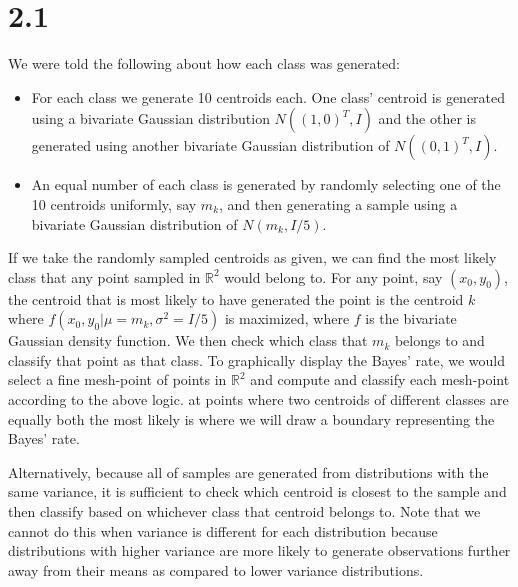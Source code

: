 \section*{2.1}

\noindent
We were told the following about how each class was generated:

\begin{itemize}
\item For each class we generate 10 centroids each. One class' centroid is 
generated using a bivariate Gaussian distribution $N((1, 0)^{T}, I)$ and the 
other is generated using another bivariate Gaussian distribution of 
$N((0, 1)^{T}, I)$.
\item An equal number of each class is generated by randomly selecting one of 
the 10 centroids uniformly, say $m_{k}$, and then generating a sample using a 
bivariate Gaussian distribution of $N(m_{k}, I / 5)$.
\end{itemize}

\noindent
If we take the randomly sampled centroids as given, we can find the most likely 
class that any point sampled in $\mathbb{R}^{2}$ would belong to. For any 
point, say $(x_{0}, y_{0})$, the centroid that is most likely to have generated 
the point is the centroid $k$ where 
$f(x_{0}, y_{0} | \mu = m_{k}, \sigma^{2} = I / 5)$ is maximized, where $f$ is 
the bivariate Gaussian density function. We then check which class that $m_{k}$ 
belongs to and classify that point as that class. To graphically display the 
Bayes' rate, we would select a fine mesh-point of points in $\mathbb{R}^{2}$ 
and compute and classify each mesh-point according to the above logic. at points 
where two centroids of different classes are equally both the most likely is 
where we will draw a boundary representing the Bayes' rate.

\vspace{5mm}
\noindent
Alternatively, because all of samples are generated from distributions with the 
same variance, it is sufficient to check which centroid is closest to the 
sample and then classify based on whichever class that centroid belongs to. 
Note that we cannot do this when variance is different for each distribution 
because distributions with higher variance are more likely to generate 
observations further away from their means as compared to lower variance 
distributions.